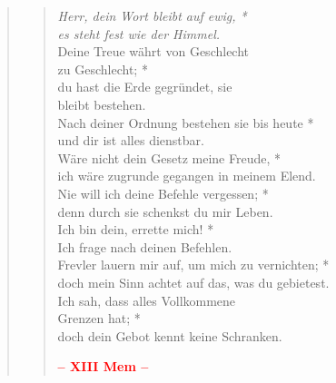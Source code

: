 \begin{quote}
\begin{verse}
\textit{Herr, dein Wort bleibt auf ewig, *\\
es steht fest wie der Himmel.}\\ \vin 
Deine Treue währt von Geschlecht \\ \vin zu Geschlecht; *\\ \vin
du hast die Erde gegründet, sie \\ \vin bleibt bestehen.\\
 Nach deiner Ordnung bestehen sie bis heute *\\
und dir ist alles dienstbar.\\ \vin 
Wäre nicht dein Gesetz meine Freude, *\\ \vin
ich wäre zugrunde gegangen in meinem Elend.\\
Nie will ich deine Befehle vergessen; *\\
denn durch sie schenkst du mir Leben.\\ \vin
Ich bin dein, errette mich! *\\ \vin
Ich frage nach deinen Befehlen.\\
Frevler lauern mir auf, um mich zu vernichten; *\\
doch mein Sinn achtet auf das, was du gebietest.\\ \vin 
Ich sah, dass alles Vollkommene \\ \vin Grenzen hat; *\\ \vin
doch dein Gebot kennt keine Schranken.\\                          

\begin{center}
 \textcolor{red}{\normalsize\bf – XIII Mem –}\\
\end{center} 


\end{verse}
\end{quote}
